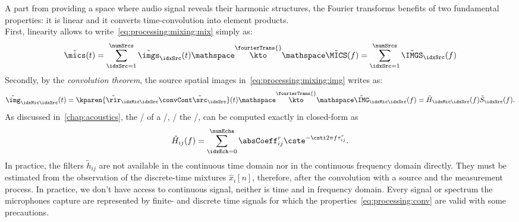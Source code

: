 
A part from providing a space where audio signal reveals their harmonic structures, the Fourier transforms benefits of two fundamental properties:
it is linear and it converts time-convolution into element products.
\\First, linearity allows to write~\cref{eq:processing:mixing:mix} simply as:
\begin{equation}\label{eq:processing:ft:mix}
    \tilde{\mics}( t) = \sum_{\idxSrc=1}^{\numSrcs} \tilde{\imgs}_\idxSrc( t)
    \mathspace\overset{\fourierTrans{}}{\kto}\mathspace
    \tilde{\MICS}( f) = \sum_{\idxSrc=1}^{\numSrcs} \tilde{\IMGS}_\idxSrc( f)
\end{equation}
Secondly, by the \textit{convolution theorem}, the source spatial images in~\cref{eq:processing:mixing:img} writes as:
\begin{equation}\label{eq:processing:conv}
    \tilde{\img}_{\idxMic\idxSrc}( t) =  \kparen{\tilde{\rir}_{\idxMic\idxSrc} \convCont \tilde{\src}_\idxSrc} ( t)
    \mathspace\overset{\fourierTrans{}}{\kto}\mathspace
    \tilde{\IMG}_{\idxMic\idxSrc}( f) =  \tilde{H}_{\idxMic\idxSrc}( f) \tilde{S}_\idxSrc( f)
    .
\end{equation}
As discussed in~\cref{chap:acoustics}, the \FT/ of a \RIR/, \aka/ the \RTFdef/, can be computed exactly in closed-form as
\begin{equation}\label{eq:processing:rir:ft}
    \tilde{H}_{ij}( f) = \sum_{\idxEch=0}^{\numEchs} \absCoeff_{ij}^r \cste^{- \csti 2 \pi f \tau_{ij}^r}
    .
\end{equation}
In practice, the filters $\tilde{h}_{ij}$ are not available in the continuous time domain nor in the continuous frequency domain directly.
They must be estimated from the observation of the discrete-time mixtures $\hat{x}_i[n]$, therefore, after the convolution with a source and the measurement process.
In practice, we don't have access to continuous signal, neither is time and in frequency domain.
Every signal or spectrum the microphones capture are represented by finite- and discrete time signals for which the properties~\eqref{eq:processing:conv} are valid with some precautions.

